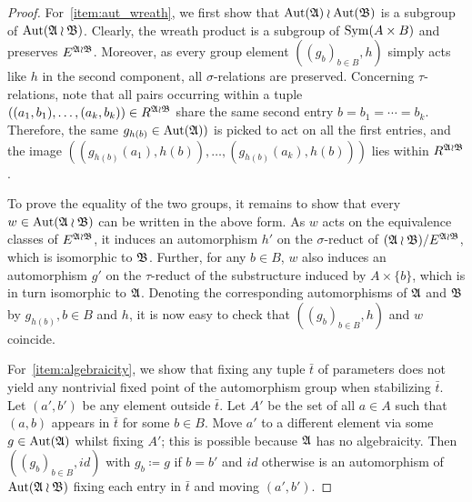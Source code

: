 \begin{proof}  
For~\eqref{item:aut_wreath}, we first show that $\mathrm{Aut}(\mathfrak{A}) \wr \mathrm{Aut}(\mathfrak{B})$ is a subgroup of $\mathrm{Aut}(\mathfrak{A}\wr\mathfrak{B})$.
    Clearly, the wreath product is a subgroup of $\mathrm{Sym}(A\times B)$ and preserves $E^{\mathfrak{A}\wr\mathfrak{B}}$.
    Moreover, as every group element $\left((g_b)_{b\in B},h\right)$ simply acts like $h$ in the second component, all $\sigma$-relations are preserved.
    Concerning $\tau$-relations, note that all pairs occurring within a tuple $((a_1,b_1),\dots,(a_k,b_k))\in R^{\mathfrak{A}\wr\mathfrak{B}}$ share the same second entry $b=b_1=\cdots =b_k$.
    Therefore, the same $g_{h(b)}\in\mathrm{Aut}(\mathfrak{A}))$ is picked to act on all the first entries, and the image $((g_{h(b)}(a_1),h(b)),\dots,(g_{h(b)}(a_k),h(b)))$ lies within $R^{\mathfrak{A}\wr\mathfrak{B}}$.
    
    To prove the equality of the two groups, it remains to show that every $w\in\mathrm{Aut}(\mathfrak{A}\wr\mathfrak{B})$ can be written in the above form.
    As $w$ acts on the equivalence classes of $E^{\mathfrak{A}\wr\mathfrak{B}}$, it induces an automorphism $h'$ on the $\sigma$-reduct of $(\mathfrak{A}\wr\mathfrak{B})/E^{\mathfrak{A}\wr\mathfrak{B}}$, which is isomorphic to $\mathfrak{B}$.
    Further, for any $b\in B$, $w$ also induces an automorphism $g'$ on the $\tau$-reduct of the substructure induced by $A\times \{b\}$, which is in turn isomorphic to $\mathfrak{A}$. 
    Denoting the corresponding automorphisms of $\mathfrak{A}$ and $\mathfrak{B}$ by $g_{h(b)},b\in B$ and $h$, it is now easy to check that $((g_b)_{b\in B},h)$ and $w$ coincide.

    For~\eqref{item:algebraicity},  we show that fixing any tuple $\bar{t}$ of parameters does not yield any nontrivial fixed point of the automorphism group when stabilizing $\bar{t}$. Let $(a',b')$ be any element outside $\bar{t}$. Let $A'$ be the set of all $a\in A$ such that $(a,b)$ appears in $\bar{t}$ for some $b\in B$. Move $a'$ to a different element via some $g\in\mathrm{Aut}(\mathfrak{A})$   whilst fixing $A'$; this is possible because $\mathfrak{A}$ has no algebraicity. Then $\left((g_b)_{b\in B},id\right)$ with $g_{b}\coloneqq g$ if $b=b'$ and $id$ otherwise is an automorphism of $\mathrm{Aut}(\mathfrak{A}\wr\mathfrak{B})$ fixing each entry in $\bar{t}$ and moving $(a',b')$. 


\end{proof}
